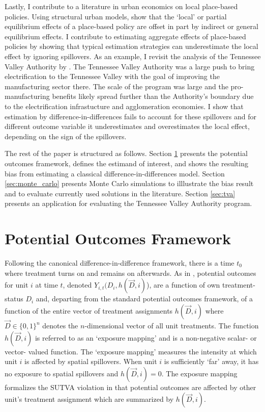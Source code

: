 \documentclass[11pt]{article}
\begin{document}
Lastly, I contribute to a literature in urban economics on local place-based policies. Using structural urban models, \citet{Kline_Moretti_2014b} show that the `local' or partial equilibrium effects of a place-based policy are offset in part by indirect or general equilibrium effects. I contribute to estimating aggregate effects of place-based policies by showing that typical estimation strategies can underestimate the local effect by ignoring spillovers. As an example, I revisit the analysis of the Tennessee Valley Authority by \citet{Kline_Moretti_2014}. The Tennessee Valley Authority was a large push to bring electrification to the Tennessee Valley with the goal of improving the manufacturing sector there. The scale of the program was large and the pro-manufacturing benefits likely spread further than the Authority's boundary due to the electrification infrastucture and agglomeration economies. I show that estimation by difference-in-differences fails to account for these spillovers and for different outcome variable it underestimates and overestimates the local effect, depending on the sign of the spillovers. 

The rest of the paper is structured as follows. Section \ref{sec:po_framework} presents the potential outcomes framework, defines the estimand of interest, and shows the resulting bias from estimating a classical difference-in-differences model. Section \ref{sec:monte_carlo} presents Monte Carlo simulations to illlustrate the bias result and to evaluate currently used solutions in the literature. Section \ref{sec:tva} presents an application for evaluating the Tennessee Valley Authority program. 



\section{Potential Outcomes Framework}
\label{sec:po_framework}

Following the canonical difference-in-difference framework, there is a time $t_0$ where treatment turns on and remains on afterwards. As in \citet{Vazquez-Bare_2019}, potential outcomes for unit $i$ at time $t$, denoted $Y_{i,t}(D_i, h(\vec{D}, i)$), are a function of own treatment-status $D_i$ and,  departing from the standard potential outcomes framework, of a function of the entire vector of treatment assignments $h(\vec{D}, i)$ where $\vec{D} \in \{0,1 \}^n$ denotes the $n$-dimensional vector of all unit treatments. The function $h(\vec{D}, i)$ is referred to as an `exposure mapping' and is a non-negative scalar- or vector- valued function. The `exposure mapping' measures the intensity at which unit $i$ is affected by spatial spillovers. When unit $i$ is sufficiently `far' away, it has no exposure to spatial spillovers and $h(\vec{D}, i) = 0$. The exposure mapping formalizes the SUTVA violation in that potential outcomes are affected by other unit's treatment assignment which are summarized by $h(\vec{D}, i)$. 
\end{document}

